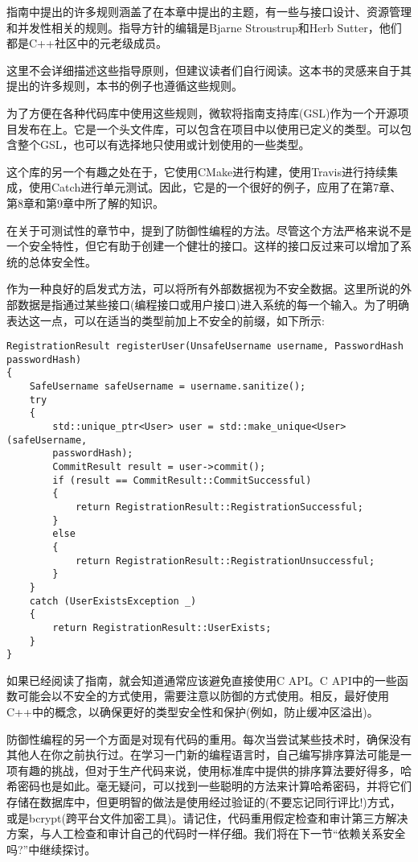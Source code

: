 指南中提出的许多规则涵盖了在本章中提出的主题，有一些与接口设计、资源管理和并发性相关的规则。指导方针的编辑是Bjarne Stroustrup和Herb Sutter，他们都是C++社区中的元老级成员。

这里不会详细描述这些指导原则，但建议读者们自行阅读。这本书的灵感来自于其提出的许多规则，本书的例子也遵循这些规则。

为了方便在各种代码库中使用这些规则，微软将指南支持库(GSL)作为一个开源项目发布在上。它是一个头文件库，可以包含在项目中以使用已定义的类型。可以包含整个GSL，也可以有选择地只使用或计划使用的一些类型。

这个库的另一个有趣之处在于，它使用CMake进行构建，使用Travis进行持续集成，使用Catch进行单元测试。因此，它是的一个很好的例子，应用了在第7章、第8章和第9章中所了解的知识。


在关于可测试性的章节中，提到了防御性编程的方法。尽管这个方法严格来说不是一个安全特性，但它有助于创建一个健壮的接口。这样的接口反过来可以增加了系统的总体安全性。

作为一种良好的启发式方法，可以将所有外部数据视为不安全数据。这里所说的外部数据是指通过某些接口(编程接口或用户接口)进入系统的每一个输入。为了明确表达这一点，可以在适当的类型前加上不安全的前缀，如下所示:

\begin{lstlisting}[style=styleCXX]
RegistrationResult registerUser(UnsafeUsername username, PasswordHash
passwordHash)
{
	SafeUsername safeUsername = username.sanitize();
	try
	{
		std::unique_ptr<User> user = std::make_unique<User>(safeUsername,
		passwordHash);
		CommitResult result = user->commit();
		if (result == CommitResult::CommitSuccessful)
		{
			return RegistrationResult::RegistrationSuccessful;
		}
		else
		{
			return RegistrationResult::RegistrationUnsuccessful;
		}
	}
	catch (UserExistsException _)
	{
		return RegistrationResult::UserExists;
	}
}
\end{lstlisting}

如果已经阅读了指南，就会知道通常应该避免直接使用C API。C API中的一些函数可能会以不安全的方式使用，需要注意以防御的方式使用。相反，最好使用C++中的概念，以确保更好的类型安全性和保护(例如，防止缓冲区溢出)。

防御性编程的另一个方面是对现有代码的重用。每次当尝试某些技术时，确保没有其他人在你之前执行过。在学习一门新的编程语言时，自己编写排序算法可能是一项有趣的挑战，但对于生产代码来说，使用标准库中提供的排序算法要好得多，哈希密码也是如此。毫无疑问，可以找到一些聪明的方法来计算哈希密码，并将它们存储在数据库中，但更明智的做法是使用经过验证的(不要忘记同行评比!)方式，或是bcrypt(跨平台文件加密工具)。请记住，代码重用假定检查和审计第三方解决方案，与人工检查和审计自己的代码时一样仔细。我们将在下一节“依赖关系安全吗?”中继续探讨。

